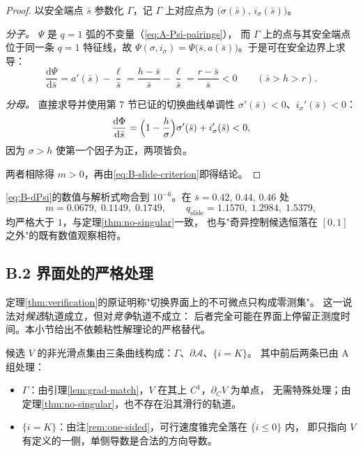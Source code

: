 \begin{proof}
以安全端点 $\bar s$ 参数化 $\Gamma$，记 $\Gamma$ 上对应点为
$\bigl(\sigma(\bar s),\,i_\sigma(\bar s)\bigr)$。

\emph{分子。} $\Psi$ 是 $q=1$ 弧的不变量（\eqref{eq:A-Psi-pairings}），
而 $\Gamma$ 上的点与其安全端点位于同一条 $q=1$ 特征线，故
$\Psi(\sigma,i_\sigma)=\Psi\bigl(\bar s,a(\bar s)\bigr)$。于是可在安全边界上求导：
\begin{equation}
  \frac{\mathrm{d}\Psi}{\mathrm{d}\bar s}
  =a'(\bar s)-\frac{\ell}{\bar s}
  =\frac{h-\bar s}{\bar s}-\frac{\ell}{\bar s}
  =\frac{r-\bar s}{\bar s}<0
  \qquad(\bar s>h>r).
  \label{eq:B-dPsi}
\end{equation}

\emph{分母。} 直接求导并使用第 7 节已证的切换曲线单调性
$\sigma'(\bar s)<0$、$i_\sigma'(\bar s)<0$：
\begin{equation}
  \frac{\mathrm{d}\Phi}{\mathrm{d}\bar s}
  =\Bigl(1-\frac{h}{\sigma}\Bigr)\sigma'(\bar s)+i_\sigma'(\bar s)<0 ,
  \label{eq:B-dPhi}
\end{equation}
因为 $\sigma>h$ 使第一个因子为正，两项皆负。

两者相除得 $m>0$，再由\eqref{eq:B-slide-criterion}即得结论。
\end{proof}

\begin{remark}[基准参数下的数值]
\eqref{eq:B-dPsi}的数值与解析式吻合到 $10^{-6}$。在 $\bar s=0.42,\,0.44,\,0.46$ 处
\[
  m=0.0679,\;0.1149,\;0.1749,
  \qquad
  q_{\mathrm{slide}}=1.1570,\;1.2984,\;1.5379,
\]
均严格大于 $1$，与定理\ref{thm:no-singular}一致，
也与"奇异控制候选恒落在 $[0,1]$ 之外"的既有数值观察相符。
\end{remark}


\subsection*{B.2 界面处的严格处理}

定理\ref{thm:verification}的原证明称"切换界面上的不可微点只构成零测集"。
这一说法对\emph{候选}轨道成立，但对\emph{竞争}轨道不成立：
后者完全可能在界面上停留正测度时间。本小节给出不依赖粘性解理论的严格替代。

候选 $V$ 的非光滑点集由三条曲线构成：$\Gamma$、$\partial\mathcal{A}$、$\{i=K\}$。
其中前后两条已由 A 组处理：

\begin{itemize}
\item $\Gamma$：由引理\ref{lem:grad-match}，$V$ 在其上 $C^1$，$\partial_C V$ 为单点，
      无需特殊处理；由定理\ref{thm:no-singular}，也不存在沿其滑行的轨道。
\item $\{i=K\}$：由注\ref{rem:one-sided}，可行速度锥完全落在 $\{\dot i\le0\}$ 内，
      即只指向 $V$ 有定义的一侧，单侧导数是合法的方向导数。
\end{itemize}

